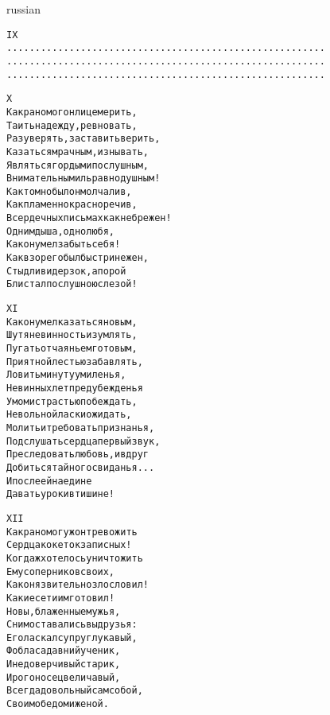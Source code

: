 \documentclass[12pt,twocolumn]{article}
\begin{document}
\begin{center}
\begin{otherlanguage*}{russian}
\begin{minipage}[t]{\dimexpr 0.5\textwidth -\tabcolsep-.5pt}
\begin{alltt}\normalfont\centering
IX
 ........................................................
 ........................................................
 ........................................................
\end{alltt}
\end{minipage}

\vspace{4in}

\begin{minipage}[t]{\dimexpr 0.5\textwidth -\tabcolsep-.5pt}
\begin{alltt}\normalfont\centering
X
Как рано мог он лицемерить,
Таить надежду, ревновать,
Разуверять, заставить верить,
Казаться мрачным, изнывать,
Являться гордым и послушным,
Внимательным иль равнодушным!
Как томно был он молчалив,
Как пламенно красноречив,
В сердечных письмах как небрежен!
Одним дыша, одно любя,
Как он умел забыть себя!
Как взор его был быстр и нежен,
Стыдлив и дерзок, а порой
Блистал послушною слезой!
\end{alltt}
\end{minipage}
\clearpage

\begin{minipage}[t]{\dimexpr 0.5\textwidth -\tabcolsep-.5pt}
\begin{alltt}\normalfont\centering
XI
Как он умел казаться новым,
Шутя невинность изумлять,
Пугать отчаяньем готовым,
Приятной лестью забавлять,
Ловить минуту умиленья,
Невинных лет предубежденья
Умом и страстью побеждать,
Невольной ласки ожидать,
Молить и требовать признанья,
Подслушать сердца первый звук,
Преследовать любовь, и вдруг
Добиться тайного свиданья...
И после ей наедине
Давать уроки в тишине!
\end{alltt}
\end{minipage}

\begin{minipage}[t]{\dimexpr 0.5\textwidth -\tabcolsep-.5pt}
\begin{alltt}\normalfont\centering
XII
Как рано мог уж он тревожить
Сердца кокеток записных!
Когда ж хотелось уничтожить
Ему соперников своих,
Как он язвительно злословил!
Какие сети им готовил!
Но вы, блаженные мужья,
С ним оставались вы друзья:
Его ласкал супруг лукавый,
Фобласа давний ученик,
И недоверчивый старик,
И рогоносец величавый,
Всегда довольный сам собой,
Своим обедом и женой.
\end{alltt}
\end{minipage}
\clearpage


\end{otherlanguage*}
\end{center}
\end{document}
